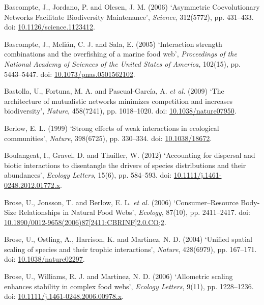 \documentclass[12pt]{article}
\begin{document}
\hypertarget{ref-basc06acn}{}
Bascompte, J., Jordano, P. and Olesen, J. M. (2006) `Asymmetric
Coevolutionary Networks Facilitate Biodiversity Maintenance',
\emph{Science}, 312(5772), pp. 431--433. doi:
\href{https://doi.org/10.1126/science.1123412}{10.1126/science.1123412}.

\hypertarget{ref-basc05isc}{}
Bascompte, J., Melián, C. J. and Sala, E. (2005) `Interaction strength
combinations and the overfishing of a marine food web',
\emph{Proceedings of the National Academy of Sciences of the United
States of America}, 102(15), pp. 5443--5447. doi:
\href{https://doi.org/10.1073/pnas.0501562102}{10.1073/pnas.0501562102}.

\hypertarget{ref-bast09amn}{}
Bastolla, U., Fortuna, M. A. and Pascual-García, A. \emph{et al.} (2009)
`The architecture of mutualistic networks minimizes competition and
increases biodiversity', \emph{Nature}, 458(7241), pp. 1018--1020. doi:
\href{https://doi.org/10.1038/nature07950}{10.1038/nature07950}.

\hypertarget{ref-berl99sew}{}
Berlow, E. L. (1999) `Strong effects of weak interactions in ecological
communities', \emph{Nature}, 398(6725), pp. 330--334. doi:
\href{https://doi.org/10.1038/18672}{10.1038/18672}.

\hypertarget{ref-boul12adb}{}
Boulangeat, I., Gravel, D. and Thuiller, W. (2012) `Accounting for
dispersal and biotic interactions to disentangle the drivers of species
distributions and their abundances', \emph{Ecology Letters}, 15(6), pp.
584--593. doi:
\href{https://doi.org/10.1111/j.1461-0248.2012.01772.x}{10.1111/j.1461-0248.2012.01772.x}.

\hypertarget{ref-bros06cbr}{}
Brose, U., Jonsson, T. and Berlow, E. L. \emph{et al.} (2006)
`Consumer--Resource Body-Size Relationships in Natural Food Webs',
\emph{Ecology}, 87(10), pp. 2411--2417. doi:
\href{https://doi.org/10.1890/0012-9658(2006)87\%5B2411:CBRINF\%5D2.0.CO;2}{10.1890/0012-9658(2006)87{[}2411:CBRINF{]}2.0.CO;2}.

\hypertarget{ref-bros04uss}{}
Brose, U., Ostling, A., Harrison, K. and Martinez, N. D. (2004) `Unified
spatial scaling of species and their trophic interactions',
\emph{Nature}, 428(6979), pp. 167--171. doi:
\href{https://doi.org/10.1038/nature02297}{10.1038/nature02297}.

\hypertarget{ref-bros06ase}{}
Brose, U., Williams, R. J. and Martinez, N. D. (2006) `Allometric
scaling enhances stability in complex food webs', \emph{Ecology
Letters}, 9(11), pp. 1228--1236. doi:
\href{https://doi.org/10.1111/j.1461-0248.2006.00978.x}{10.1111/j.1461-0248.2006.00978.x}.
\end{document}
